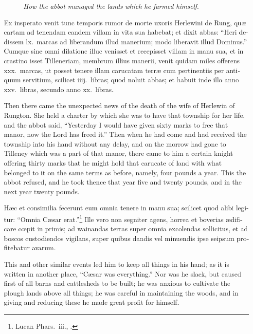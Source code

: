 \documentclass{book}
\newcommand{\blockhead}[4][]{
\begin{figure}
\centering
\vspace{#4}
\parbox{2.75cm}{\begin{center}\footnotesize \color{BrickRed} \emph{#2}\\ #1 \end{center}}
\end{figure}
}
\begin{document}
\begin{paracol}{2}
\switchcolumn*

\begin{otherlanguage}{latin}
\blockhead{How the abbot managed the lands which he farmed himself.}{4}{-0.45cm}
Ex insperato venit tunc temporis rumor de morte uxoris Herlewini de Rung, qu\ae{} cartam ad tenendam eandem villam in vita sua habebat; et dixit abbas: ``Heri dedissem lx.\ marcas ad liberandum illud manerium; modo liberavit illud Dominus.'' Cumque sine omni dilatione illuc venisset et recepisset villam in manu sua, et in crastino isset Tilleneriam, membrum illius manerii, venit quidam miles offerens xxx.\ marcas, ut posset tenere illam carucatam terr\ae{} cum pertinentiis per antiquum servitium, scilicet iiij.\ libras; quod noluit abbas; et habuit inde illo anno xxv.\ libras, secundo anno xx.\ libras.

\end{otherlanguage}

\switchcolumn

Then there came the unexpected news of the death of the wife of Herlewin of Rungton. She held a charter by which she was to have that township for her life, and the abbot said, ``Yesterday I would have given sixty marks to free that manor, now the Lord has freed it.'' Then when he had come and had received the township into his hand without any delay, and on the morrow had gone to Tilleney which was a part of that manor, there came to him a certain knight offering thirty marks that he might hold that carucate of land with what belonged to it on the same terms as before, namely, four pounds a year. This the abbot refused, and he took thence that year five and twenty pounds, and in the next year twenty pounds.

\switchcolumn*

\begin{otherlanguage}{latin}
H\ae{}c et consimilia fecerunt eum omnia tenere in manu sua; scilicet quod alibi legitur: ``Omnia C\ae{}sar erat.''\footnote[\textdagger]{Lucan Phars.\ iii., .} Ille vero non segniter agens, horrea et boverias \ae{}dificare c\oe{}pit in primis; ad wainandas terras super omnia excolendas sollicitus, et ad boscos custodiendos vigilans, super quibus dandis vel minuendis ipse seipsum profitebatur avarum.
\end{otherlanguage}

\switchcolumn

This and other similar events led him to keep all things in his hand; as it is written in another place, ``C\ae{}sar was everything.'' Nor was he slack, but caused first of all barns and cattlesheds to be built; he was anxious to cultivate the plough lands above all things; he was careful in maintaining the woods, and in giving and reducing these he made great profit for himself.


\end{paracol}
\end{document}
